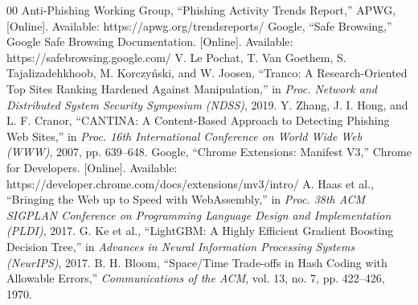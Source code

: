 \documentclass[conference]{IEEEtran}
\begin{document}
\begin{thebibliography}{00}
 Anti-Phishing Working Group, ``Phishing Activity Trends Report,'' APWG, [Online]. Available: https://apwg.org/trendsreports/
 Google, ``Safe Browsing,'' Google Safe Browsing Documentation. [Online]. Available: https://safebrowsing.google.com/
 V. Le Pochat, T. Van Goethem, S. Tajalizadehkhoob, M. Korczy{\'n}ski, and W. Joosen, ``Tranco: A Research-Oriented Top Sites Ranking Hardened Against Manipulation,'' in \emph{Proc. Network and Distributed System Security Symposium (NDSS)}, 2019.
 Y. Zhang, J. I. Hong, and L. F. Cranor, ``CANTINA: A Content-Based Approach to Detecting Phishing Web Sites,'' in \emph{Proc. 16th International Conference on World Wide Web (WWW)}, 2007, pp. 639--648.
 Google, ``Chrome Extensions: Manifest V3,'' Chrome for Developers. [Online]. Available: https://developer.chrome.com/docs/extensions/mv3/intro/
 A. Haas et al., ``Bringing the Web up to Speed with WebAssembly,'' in \emph{Proc. 38th ACM SIGPLAN Conference on Programming Language Design and Implementation (PLDI)}, 2017.
 G. Ke et al., ``LightGBM: A Highly Efficient Gradient Boosting Decision Tree,'' in \emph{Advances in Neural Information Processing Systems (NeurIPS)}, 2017.
 B. H. Bloom, ``Space/Time Trade-offs in Hash Coding with Allowable Errors,'' \emph{Communications of the ACM}, vol. 13, no. 7, pp. 422--426, 1970.
\end{thebibliography}
\end{document}
